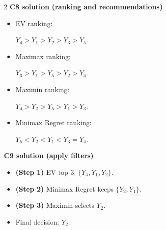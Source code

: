 \documentclass[12pt]{article}
\begin{document}
\begin{multicols}{2}
		\textbf{C8 solution (ranking and recommendations)}\par
		\begin{itemize}
			\item EV ranking: \par $Y_4>Y_1>Y_2>Y_3>Y_5$.
			\item Maximax ranking: \par $Y_3>Y_1>Y_5>Y_2>Y_4$.
			\item Maximin ranking: \par $Y_4>Y_2>Y_5>Y_1>Y_3$.
			\item Minimax Regret ranking: \par $Y_5<Y_2<Y_1<Y_3=Y_4$.
		\end{itemize}
		
		\textbf{C9 solution (apply filters)}\par
		\begin{itemize}
			\item \textbf{(Step 1)} EV top 3: $\{Y_4,Y_1,Y_2\}$.
			\item \textbf{(Step 2)} Minimax Regret keeps $\{Y_2,Y_1\}$.
			\item \textbf{(Step 3)} Maximin selects $Y_2$.
			\item Final decision: $Y_2$.
		\end{itemize}
		
		
		
	\end{multicols}
	
\end{document}
